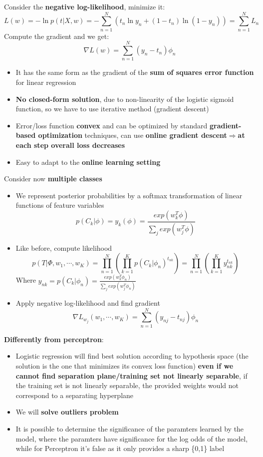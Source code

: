     Consider the \textbf{negative log-likelihood}, minimize it:
    $$L(w)=-\ln p(t|X,w)=-\sum_{n=1}^N(t_n\ln y_n+(1-t_n)\ln(1-y_n))=\sum_{n=1}^N L_n$$
    Compute the gradient and we get:
    $$\nabla L(w)=\sum_{n=1}^N(y_n-t_n)\phi_n$$
    \begin{itemize}
        \item It has the same form as the gradient of the \textbf{sum of squares error function} for linear regression
        \item \textbf{No closed-form solution}, due to non-linearity of the logistic sigmoid function, so we have to use iterative method (gradient descent)
        \item Error/loss function \textbf{convex} and can be optimized by standard \textbf{gradient-based optimization} techniques, can use \textbf{online gradient descent$\Rightarrow$at each step overall loss decreases}
        \item Easy to adapt to the \textbf{online learning setting}
    \end{itemize}
    Consider now \textbf{multiple classes}
    \begin{itemize}
        \item We represent posterior probabilities by a softmax transformation of linear functions of feature variables
        $$p(C_k|\phi)=y_k(\phi)=\frac{
            exp(w_k^T\phi)
        }{
            \sum_j exp(w_j^T\phi)
        }$$
        \item Like before, compute likelihood
        $$p(T|\Phi,w_1,\cdots,w_K)=\prod_{n=1}^N\left(
            \prod_{k=1}^Kp(C_k|\phi_n)^{t_{nk}}
        \right)=\prod_{n=1}^N\left(
            \prod_{k=1}^Ky_{nk}^{t_{nk}}
        \right)$$
        Where $y_{nk}=p(C_k|\phi_n)=\frac{
            exp(w_k^T\phi_n)
        }{\sum_jexp(w_j^T\phi_n)}$
        \item Apply negative log-likelihood and find gradient
        $$\nabla L_{w_j}(w_1,\cdots,w_K)=\sum_{n=1}^N(y_{nj}-t_{nj})\phi_n$$
    \end{itemize}
    \textbf{Differently from perceptron}:
    \begin{itemize}
        \item Logistic regression will find best solution according to hypothesis space (the solution is the one that minimizes its convex loss function) \textbf{even if we cannot find separation plane/training set not linearly separable}, if the training set is not linearly separable, the provided weights would not correspond to a separating hyperplane
        \item We will \textbf{solve outliers problem}
        \item It is possible to determine the significance of the paramters learned by the model, where the paramters have significance for the log odds of the model, while for Perceptron it's false as it only provides a sharp \{0,1\} label
    \end{itemize}
